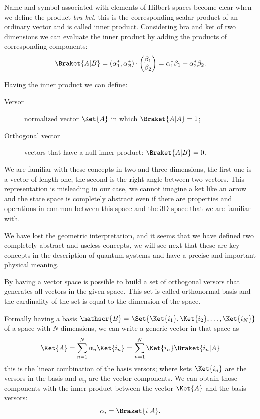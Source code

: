 Name and symbol associated with elements of Hilbert spaces become clear when we define the product \emph{bra-ket}, this is the corresponding scalar product of an ordinary vector and is called inner product. Considering bra and ket of two dimensions we can evaluate the inner product by adding the products of corresponding components:
\[
\Braket{A|B}=\left(\alpha_1^*, \alpha_2^*\right)\cdot 
\begin{pmatrix}
	\beta_1 \\
	\beta_2
\end{pmatrix}
= \alpha_1^*\beta_1 + \alpha_2^*\beta_2.
\]

Having the inner product we can define:
\begin{description}
	\item [Versor] normalized vector $\Ket{A}$ in which $\Braket{A|A} = 1$;
	\item[Orthogonal vector] vectors that have a null inner product: $\Braket{A|B} = 0$.
\end{description}

We are familiar with these concepts in two and three dimensions, the first one is a vector of length one, the second is the right angle between two vectors. This representation is misleading in our case, we cannot imagine a ket like an arrow and the state space is completely abstract even if there are properties and operations in common between this space and the 3D space that we are familiar with.

We have lost the geometric interpretation, and it seems that we have defined two completely abstract and useless concepts, we will see next that these are key concepts in the description of quantum systems and have a precise and important physical meaning.

By having a vector space is possible to build a set of orthogonal versors that generates all vectors in the given space. This set is called orthonormal basis and the cardinality of the set is equal to the dimension of the space.

Formally having a basis $\mathscr{B} = \Set{\Ket{i_1}, \Ket{i_2}, \dots, \Ket{i_N}}$ of a space with $N$ dimensions, we can write a generic vector in that space as
\begin{equation}
	\Ket{A}=\sum_{n=1}^{N} \alpha_n \Ket{i_n} = \sum_{n=1}^{N} \Ket{i_n} \Braket{i_n|A}
\end{equation}
this is the linear combination of the basis versors; where kets $\Ket{i_n}$ are the versors in the basis and $\alpha_n$ are the vector components. We can obtain those components with the inner product between the vector $\Ket{A}$ and the basis versors:
\begin{equation}
	\label{eqn:decomp}
	\alpha_i = \Braket{i|A}.
\end{equation}

